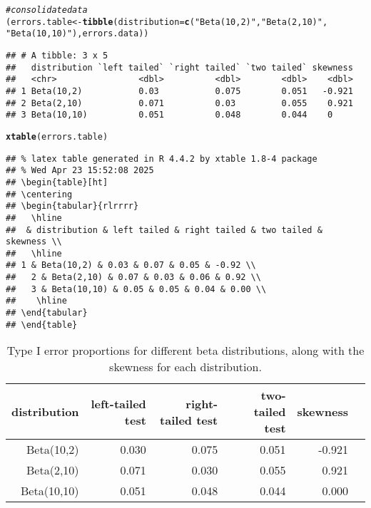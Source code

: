 \documentclass{article}\usepackage[]{graphicx}\usepackage[]{xcolor}
\makeatletter
\newcommand{\hlsng}[1]{\textcolor[rgb]{0.192,0.494,0.8}{#1}}%
\newcommand{\hlcom}[1]{\textcolor[rgb]{0.678,0.584,0.686}{\textit{#1}}}%
\newcommand{\hldef}[1]{\textcolor[rgb]{0.345,0.345,0.345}{#1}}%
\newcommand{\hlkwb}[1]{\textcolor[rgb]{0.69,0.353,0.396}{#1}}%
\newcommand{\hlkwc}[1]{\textcolor[rgb]{0.333,0.667,0.333}{#1}}%
\newcommand{\hlkwd}[1]{\textcolor[rgb]{0.737,0.353,0.396}{\textbf{#1}}}%
\newenvironment{kframe}{%
 \def\at@end@of@kframe{}%
 \ifinner\ifhmode%
  \def\at@end@of@kframe{\end{minipage}}%
  \begin{minipage}{\columnwidth}%
 \fi\fi%
 \def\FrameCommand##1{\hskip\@totalleftmargin \hskip-\fboxsep
 \colorbox{shadecolor}{##1}\hskip-\fboxsep
     \hskip-\linewidth \hskip-\@totalleftmargin \hskip\columnwidth}%
 \MakeFramed {\advance\hsize-\width
   \@totalleftmargin\z@ \linewidth\hsize
   \@setminipage}}%
 {\par\unskip\endMakeFramed%
 \at@end@of@kframe}
\newenvironment{knitrout}{}{} %
\makeatother
\begin{document}
\begin{enumerate}
\begin{knitrout}
\begin{kframe}
\begin{alltt}
\hlcom{# consolidate data }
\hldef{(errors.table} \hlkwb{<-} \hlkwd{tibble}\hldef{(}\hlkwc{distribution} \hldef{=} \hlkwd{c}\hldef{(}\hlsng{"Beta(10,2)"}\hldef{,} \hlsng{"Beta(2,10)"}\hldef{,}
                                      \hlsng{"Beta(10,10)"}\hldef{), errors.data))}
\end{alltt}
\begin{verbatim}
## # A tibble: 3 x 5
##   distribution `left tailed` `right tailed` `two tailed` skewness
##   <chr>                <dbl>          <dbl>        <dbl>    <dbl>
## 1 Beta(10,2)           0.03           0.075        0.051   -0.921
## 2 Beta(2,10)           0.071          0.03         0.055    0.921
## 3 Beta(10,10)          0.051          0.048        0.044    0
\end{verbatim}
\begin{alltt}
\hlkwd{xtable}\hldef{(errors.table)}
\end{alltt}
\begin{verbatim}
## % latex table generated in R 4.4.2 by xtable 1.8-4 package
## % Wed Apr 23 15:52:08 2025
## \begin{table}[ht]
## \centering
## \begin{tabular}{rlrrrr}
##   \hline
##  & distribution & left tailed & right tailed & two tailed & skewness \\ 
##   \hline
## 1 & Beta(10,2) & 0.03 & 0.07 & 0.05 & -0.92 \\ 
##   2 & Beta(2,10) & 0.07 & 0.03 & 0.06 & 0.92 \\ 
##   3 & Beta(10,10) & 0.05 & 0.05 & 0.04 & 0.00 \\ 
##    \hline
## \end{tabular}
## \end{table}
\end{verbatim}
\end{kframe}
\end{knitrout}
\begin{table}[ht]
\centering
\begin{tabular}{rrrrrr}
  \hline
 distribution & left-tailed test & right-tailed test & two-tailed test & skewness \\ 
  \hline
Beta(10,2) & 0.030 & 0.075 & 0.051 & -0.921 \\ 
Beta(2,10) & 0.071 & 0.030 & 0.055 & 0.921 \\ 
Beta(10,10) & 0.051 & 0.048 & 0.044 & 0.000 \\ 
   \hline
\end{tabular}
\caption{Type I error proportions for different beta distributions, along with the skewness for each distribution.}
\label{table1}
\end{table}


\end{enumerate}
\end{document}
